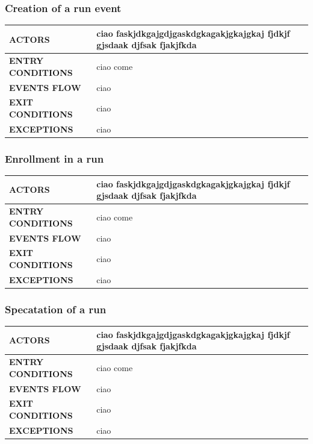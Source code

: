 \documentclass[a4paper]{article}
\begin{document}
\vspace{1cm}

\subsubsection{Creation of a run event}
\begin{center}
    \begin{tabular}{l || p{8cm} ||}
        \bf{ACTORS} & ciao faskjdkgajgdjgaskdgkagakjgkajgkaj fjdkjf gjsdaak djfsak fjakjfkda \\ \hline
        \bf{ENTRY CONDITIONS} & ciao come  \\ \hline
        \bf{EVENTS FLOW} & ciao\\ \hline
        \bf{EXIT CONDITIONS} & ciao\\ \hline
        \bf{EXCEPTIONS} & ciao\\ \hline \hline
    \end{tabular}
\end{center}

\vspace{1cm}

\subsubsection{Enrollment in a run}
\begin{center}
    \begin{tabular}{l || p{8cm} ||}
        \bf{ACTORS} & ciao faskjdkgajgdjgaskdgkagakjgkajgkaj fjdkjf gjsdaak djfsak fjakjfkda \\ \hline
        \bf{ENTRY CONDITIONS} & ciao come  \\ \hline
        \bf{EVENTS FLOW} & ciao\\ \hline
        \bf{EXIT CONDITIONS} & ciao\\ \hline
        \bf{EXCEPTIONS} & ciao\\ \hline \hline
    \end{tabular}
\end{center}

\vspace{1cm}

\subsubsection{Specatation of a run}
\begin{center}
    \begin{tabular}{l || p{8cm} ||}
        \bf{ACTORS} & ciao faskjdkgajgdjgaskdgkagakjgkajgkaj fjdkjf gjsdaak djfsak fjakjfkda \\ \hline
        \bf{ENTRY CONDITIONS} & ciao come  \\ \hline
        \bf{EVENTS FLOW} & ciao\\ \hline
        \bf{EXIT CONDITIONS} & ciao\\ \hline
        \bf{EXCEPTIONS} & ciao\\ \hline \hline
    \end{tabular}
\end{center}
\end{document}
